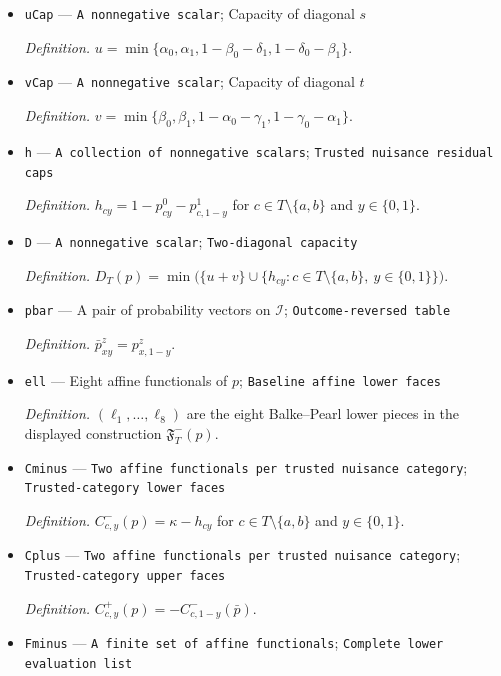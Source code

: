 \documentclass{article}
\begin{document}
\begin{itemize}
  \par\smallskip\noindent\emph{Definition.} \(\kappa=-1+\alpha_0+\alpha_1+\beta_0+\beta_1\).
  \item \texttt{uCap} --- \texttt{A nonnegative scalar}; Capacity of diagonal \(s\)
  \par\smallskip\noindent\emph{Definition.} \(u=\min\{\alpha_0,\alpha_1,1-\beta_0-\delta_1,1-\delta_0-\beta_1\}\).
  \item \texttt{vCap} --- \texttt{A nonnegative scalar}; Capacity of diagonal \(t\)
  \par\smallskip\noindent\emph{Definition.} \(v=\min\{\beta_0,\beta_1,1-\alpha_0-\gamma_1,1-\gamma_0-\alpha_1\}\).
  \item \texttt{h} --- \texttt{A collection of nonnegative scalars}; \texttt{Trusted nuisance residual caps}
  \par\smallskip\noindent\emph{Definition.} \(h_{cy}=1-p^0_{cy}-p^1_{c,1-y}\) for \(c\in T\setminus\{a,b\}\) and \(y\in\{0,1\}\).
  \item \texttt{D} --- \texttt{A nonnegative scalar}; \texttt{Two-\allowbreak{}diagonal capacity}
  \par\smallskip\noindent\emph{Definition.} \(D_T(p)=\min\bigl(\{u+v\}\cup\{h_{cy}:c\in T\setminus\{a,b\},\ y\in\{0,1\}\}\bigr)\).
  \item \texttt{pbar} --- A pair of probability vectors on \(\mathcal I\); \texttt{Outcome-\allowbreak{}reversed table}
  \par\smallskip\noindent\emph{Definition.} \(\bar p^z_{xy}=p^z_{x,1-y}\).
  \item \texttt{ell} --- Eight affine functionals of \(p\); \texttt{Baseline affine lower faces}
  \par\smallskip\noindent\emph{Definition.} \((\ell_1,\ldots,\ell_8)\) are the eight Balke--Pearl lower pieces in the displayed construction \(\mathfrak F^-_T(p)\).
  \item \texttt{Cminus} --- \texttt{Two affine functionals per trusted nuisance category}; \texttt{Trusted-\allowbreak{}category lower faces}
  \par\smallskip\noindent\emph{Definition.} \(C^-_{c,y}(p)=\kappa-h_{cy}\) for \(c\in T\setminus\{a,b\}\) and \(y\in\{0,1\}\).
  \item \texttt{Cplus} --- \texttt{Two affine functionals per trusted nuisance category}; \texttt{Trusted-\allowbreak{}category upper faces}
  \par\smallskip\noindent\emph{Definition.} \(C^+_{c,y}(p)=-C^-_{c,1-y}(\bar p)\).
  \item \texttt{Fminus} --- \texttt{A finite set of affine functionals}; \texttt{Complete lower evaluation list}

\end{itemize}
\end{document}
